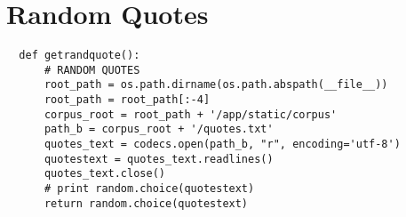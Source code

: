 \section{Random Quotes}

\begin{verbatim}
  def getrandquote():
      # RANDOM QUOTES
      root_path = os.path.dirname(os.path.abspath(__file__))
      root_path = root_path[:-4]
      corpus_root = root_path + '/app/static/corpus'
      path_b = corpus_root + '/quotes.txt'
      quotes_text = codecs.open(path_b, "r", encoding='utf-8')
      quotestext = quotes_text.readlines()
      quotes_text.close()
      # print random.choice(quotestext)
      return random.choice(quotestext)
\end{verbatim}
